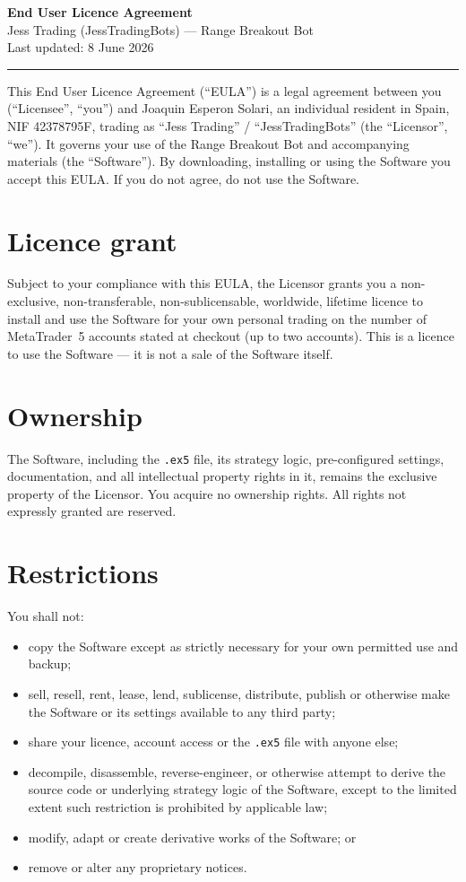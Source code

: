\documentclass[11pt,a4paper]{article}
\begin{document}
\thispagestyle{fancy}

{\Huge\bfseries End User Licence Agreement}\\[0.4em]
{\large Jess Trading (JessTradingBots) --- Range Breakout Bot}\\[0.3em]
{\small Last updated: 8 June 2026}

\vspace{0.6em}
\hrule
\vspace{1em}

This End User Licence Agreement (``EULA'') is a legal agreement between you (``Licensee'', ``you'')
and Joaquin Esperon Solari, an individual resident in Spain, NIF 42378795F, trading as
``Jess Trading'' / ``JessTradingBots'' (the ``Licensor'', ``we''). It governs your use of
the Range Breakout Bot and accompanying materials (the ``Software''). By downloading, installing or
using the Software you accept this EULA. If you do not agree, do not use the Software.

\section{Licence grant}
Subject to your compliance with this EULA, the Licensor grants you a non-exclusive,
non-transferable, non-sublicensable, worldwide, lifetime licence to install and use the Software for
your own personal trading on the number of MetaTrader~5 accounts stated at checkout (up to two
accounts). This is a licence to use the Software --- it is not a sale of the Software itself.

\section{Ownership}
The Software, including the \texttt{.ex5} file, its strategy logic, pre-configured settings,
documentation, and all intellectual property rights in it, remains the exclusive property of the
Licensor. You acquire no ownership rights. All rights not expressly granted are reserved.

\section{Restrictions}
You shall not:
\begin{itemize}
  \item copy the Software except as strictly necessary for your own permitted use and backup;
  \item sell, resell, rent, lease, lend, sublicense, distribute, publish or otherwise make the
  Software or its settings available to any third party;
  \item share your licence, account access or the \texttt{.ex5} file with anyone else;
  \item decompile, disassemble, reverse-engineer, or otherwise attempt to derive the source code or
  underlying strategy logic of the Software, except to the limited extent such restriction is
  prohibited by applicable law;
  \item modify, adapt or create derivative works of the Software; or
  \item remove or alter any proprietary notices.
\end{itemize}
\end{document}
